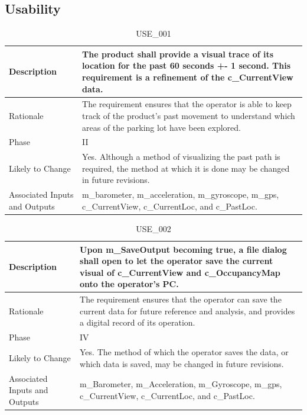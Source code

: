 \documentclass{article}
\begin{document}
\subsection{Usability}
\begin{table}[!h]
\begin{center}
\caption {USE\_001} 
\label{USE_001}
\begin{tabular}{ | m{3cm} | m{11cm} | }
\hline
Description & The product shall provide a visual trace of its location for the past 60 seconds +- 1 second. This requirement is a refinement of the c\_CurrentView data. \\
\hline
Rationale & The requirement ensures that the operator is able to keep track of the product's past movement to understand which areas of the parking lot have been explored. \\
\hline
Phase & II \\
\hline
Likely to Change & Yes. Although a method of visualizing the past path is required, the method at which it is done may be changed in future revisions.  \\
\hline
Associated Inputs and Outputs & m\_barometer, m\_acceleration, m\_gyroscope, m\_gps, c\_CurrentView, c\_CurrentLoc, and c\_PastLoc.  \\
\hline
\end{tabular}
\end{center}
\end{table}

\begin{table}[!h]
\begin{center}
\caption {USE\_002} 
\label{USE_002}
\begin{tabular}{ | m{3cm} | m{11cm} | }
\hline
Description & Upon m\_SaveOutput becoming true, a file dialog shall open to let the operator save the current visual of c\_CurrentView and c\_OccupancyMap onto the operator's PC.  \\
\hline
Rationale & The requirement ensures that the operator can save the current data for future reference and analysis, and provides a digital record of its operation. \\
\hline
Phase & IV \\
\hline
Likely to Change & Yes. The method of which the operator saves the data, or which data is saved, may  be changed in future revisions. \\
\hline
Associated Inputs and Outputs & m\_Barometer, m\_Acceleration, m\_Gyroscope, m\_gps, c\_CurrentView, c\_CurrentLoc, and c\_PastLoc.  \\
\hline
\end{tabular}
\end{center}
\end{table}
\end{document}
